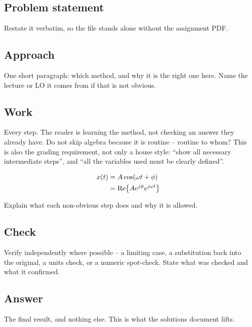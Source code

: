 
\subsection*{Problem statement}

Restate it verbatim, so the file stands alone without the assignment PDF.

\subsection*{Approach}

One short paragraph: which method, and why it is the right one here. Name the
lecture or LO it comes from if that is not obvious.

\subsection*{Work}

Every step. The reader is learning the method, not checking an answer they
already have. Do not skip algebra because it is routine -- routine to whom?
This is also the grading requirement, not only a house style: ``show all
necessary intermediate steps'', and ``all the variables used must be clearly
defined''.

\begin{align}
  x(t) &= A\cos(\omega t + \phi) \\
       &= \operatorname{Re}\!\left\{ A e^{j\phi} e^{j\omega t} \right\}
\end{align}

Explain what each non-obvious step does and why it is allowed.

\subsection*{Check}

Verify independently where possible -- a limiting case, a substitution back
into the original, a units check, or a numeric spot-check. State what was
checked and what it confirmed.

\subsection*{Answer}

\begin{answerbox}
The final result, and nothing else. This is what the solutions document lifts.
\end{answerbox}


